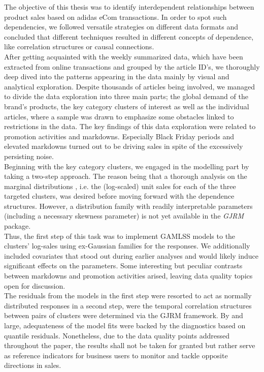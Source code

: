 
The objective of this thesis was to identify interdependent relationships between product sales based on adidas eCom transactions. In order to spot such dependencies, we followed versatile strategies on different data formats  and concluded that different techniques resulted in different concepts of dependence, like correlation structures or causal connections.
\\

After getting acquainted with the weekly summarized data, which have been extracted from online transactions and grouped by the article ID's, we thoroughly deep dived into the patterns appearing in the data mainly by visual and analytical exploration. Despite thousands of articles being involved, we managed to divide the data exploration into three main parts; the global demand of the brand's products, the key category clusters of interest as well as the individual articles, where a sample was drawn to emphasize some obstacles linked to restrictions in the data. The key findings of this data exploration were related to promotion activities and markdowns. Especially Black Friday periods and elevated markdowns turned out to be driving sales in spite of the excessively persisting noise.
\\

Beginning with the key category clusters, we engaged in the modelling part by taking a two-step approach. The reason being that a thorough analysis on the marginal distributions , i.e. the (log-scaled) unit sales for each of the three targeted clusters, was desired before moving forward with the dependence structures. However, a distribution family with readily interpretable parameters (including a necessary skewness parameter) is not yet available in the \textit{GJRM} package. \\
Thus, the first step of this task was to implement \ac{GAMLSS} models to the clusters' log-sales using ex-Gaussian families for the responses. We additionally included covariates that stood out during earlier analyses and would likely induce significant effects on the parameters. Some interesting but peculiar contrasts between markdowns and promotion activities arised, leaving data quality topics open for discussion.\\
The residuals from the models in the first step were resorted to act as normally distributed responses in a second step, were the temporal correlation structures between pairs of clusters were determined via the \ac{GJRM} framework. By and large, adequateness of the model fits were backed by the diagnostics based on quantile residuals. Nonetheless, due to the data quality points addressed throughout the paper, the results shall not be taken for granted but rather serve as reference indicators for business users to monitor and tackle opposite directions in sales.
\\

